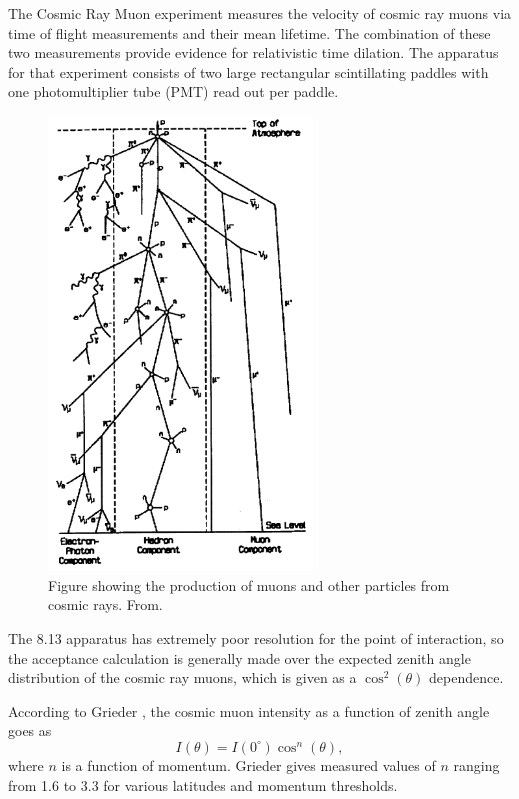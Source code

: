 The Cosmic Ray Muon experiment \cite{spatrick} measures the velocity of cosmic ray muons via time of flight measurements and their mean lifetime. The combination of these two measurements provide evidence for relativistic time dilation. The apparatus for that experiment consists of two large rectangular scintillating paddles with one photomultiplier tube (PMT) read out per paddle. 

\begin{figure}[htb]
\includegraphics[width=7cm]{muon_shower.png}
\caption{Figure showing the production of muons and other particles from cosmic rays. From\cite{grieder}.}
\label{fig:muon_shower}
\end{figure}

The 8.13 apparatus has extremely poor resolution for the point of interaction, so the acceptance calculation is generally made over the expected zenith angle distribution of the cosmic ray muons, which is given as a $\cos^2(\theta)$ dependence. 

According to Grieder \cite{grieder}, the cosmic muon intensity as a function of zenith angle goes as 
\begin{equation}
\label{eqn:cosn}
I(\theta)=I(0^\circ)\cos^{n}(\theta),
\end{equation} 
where $n$ is a function of momentum. Grieder gives measured values of $n$ ranging from 1.6 to 3.3 for various latitudes and momentum thresholds.


